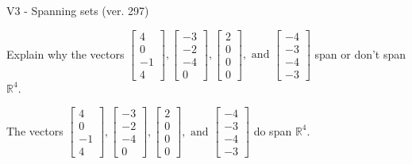 \begin{exercise}
  \begin{exerciseTitle}V3 - Spanning sets (ver. 297)\end{exerciseTitle}
  \begin{exerciseStatement}
    Explain why the vectors \(\left[\begin{array}{r}
4 \\
0 \\
-1 \\
4
\end{array}\right] , \left[\begin{array}{r}
-3 \\
-2 \\
-4 \\
0
\end{array}\right] , \left[\begin{array}{r}
2 \\
0 \\
0 \\
0
\end{array}\right] , \text{ and } \left[\begin{array}{r}
-4 \\
-3 \\
-4 \\
-3
\end{array}\right]\) span or don't span \(\mathbb{R}^4\). 
	


  \end{exerciseStatement}
  \begin{exerciseAnswer}
   The vectors \(\left[\begin{array}{r}
4 \\
0 \\
-1 \\
4
\end{array}\right] , \left[\begin{array}{r}
-3 \\
-2 \\
-4 \\
0
\end{array}\right] , \left[\begin{array}{r}
2 \\
0 \\
0 \\
0
\end{array}\right] , \text{ and } \left[\begin{array}{r}
-4 \\
-3 \\
-4 \\
-3
\end{array}\right]\) 
  	 do  
	span \(\mathbb{R}^4\).
  


  \end{exerciseAnswer}
\end{exercise}